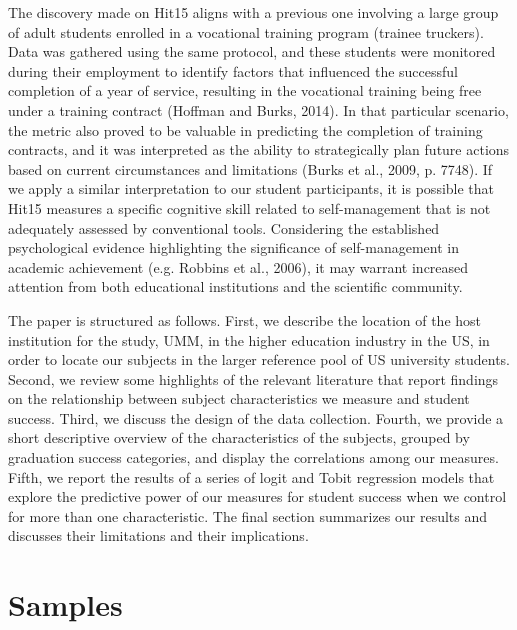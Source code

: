 \documentclass[12pt,a4paper]{article}
\begin{document}
The discovery made on Hit15 aligns with a previous one involving a large group of adult students enrolled in a vocational training program (trainee truckers). Data was gathered using the same protocol, and these students were monitored during their employment to identify factors that influenced the successful completion of a year of service, resulting in the vocational training being free under a training contract (Hoffman and Burks, 2014). In that particular scenario, the metric also proved to be valuable in predicting the completion of training contracts, and it was interpreted as the ability to strategically plan future actions based on current circumstances and limitations (Burks et al., 2009, p. 7748). If we apply a similar interpretation to our student participants, it is possible that Hit15 measures a specific cognitive skill related to self-management that is not adequately assessed by conventional tools. Considering the established psychological evidence highlighting the significance of self-management in academic achievement (e.g. Robbins et al., 2006), it may warrant increased attention from both educational institutions and the scientific community.

The paper is structured as follows. First, we describe the location of the host institution for the study, UMM, in the higher
education industry in the US, in order to locate our subjects in the larger reference pool of US university students. Second,
we review some highlights of the relevant literature that report findings on the relationship between subject characteristics
we measure and student success. Third, we discuss the design of the data collection. Fourth, we provide a short descriptive
overview of the characteristics of the subjects, grouped by graduation success categories, and display the correlations among
our measures. Fifth, we report the results of a series of logit and Tobit regression models that explore the predictive power
of our measures for student success when we control for more than one characteristic. The final section summarizes our
results and discusses their limitations and their implications.

\section{Samples}
\end{document}
